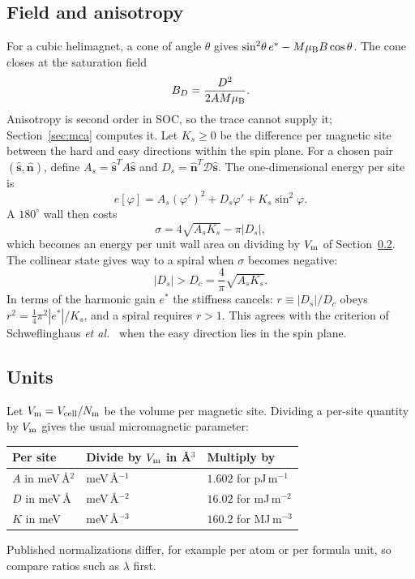\documentclass[11pt,a4paper]{article}
\numberwithin{equation}{section}
\newcommand{\vct}[1]{\bm{#1}}
\newcommand{\nh}{\hat{\vct n}}
\newcommand{\sh}{\hat{\vct s}}
\newcommand{\Nm}{N_{\mathrm m}}
\newcommand{\Dt}{\mathcal D}
\begin{document}
\subsection{Field and anisotropy}

For a cubic helimagnet, a cone of angle $\theta$ gives
$\sin^2\!\theta\,e^*-M\mu_{\rm B}B\cos\theta$. The cone closes at the saturation field
\begin{equation}\label{eq:bd}
 B_D=\frac{D^2}{2AM\mu_{\rm B}}.
\end{equation}
Anisotropy is second order in SOC, so the trace cannot supply it;
Section~\ref{sec:mca} computes it. Let $K_s\ge0$ be the difference per magnetic
site between the hard and easy directions within the spin plane. For a chosen
pair $(\sh,\nh)$, define $A_s=\sh^TA\sh$ and
$D_s=\nh^T\Dt\sh$. The one-dimensional energy per site is
\begin{equation}\label{eq:sg}
 e[\varphi]=A_s(\varphi')^2+D_s\varphi'+K_s\sin^2\varphi.
\end{equation}
A $180^\circ$ wall then costs
\begin{equation}\label{eq:wall}
 \sigma=4\sqrt{A_sK_s}-\pi|D_s|,
\end{equation}
which becomes an energy per unit wall area on dividing by $V_{\rm m}$ of
Section~\ref{sec:units}. The collinear state gives way to a spiral when $\sigma$ becomes negative:
\begin{equation}\label{eq:dc}
 |D_s|>D_c=\frac{4}{\pi}\sqrt{A_sK_s}.
\end{equation}
In terms of the harmonic gain $e^*$ the stiffness cancels:
$r\equiv|D_s|/D_c$ obeys $r^2=\tfrac14\pi^2|e^*|/K_s$, and a spiral requires
$r>1$. This agrees with the criterion of Schweflinghaus
\emph{et al.}~\cite{schwef} when the easy direction lies in the spin plane.

\subsection{Units}\label{sec:units}

Let $V_{\rm m}=V_{\rm cell}/\Nm$ be the volume per magnetic site. Dividing a
per-site quantity by $V_{\rm m}$ gives the usual micromagnetic parameter:
\begin{center}
\begin{tabular}{@{}lll@{}}
\toprule Per site & Divide by $V_{\rm m}$ in \AA$^3$ & Multiply by\\\midrule
$A$ in meV\,\AA$^2$ & meV\,\AA$^{-1}$ & $1.602$ for pJ\,m$^{-1}$\\
$D$ in meV\,\AA & meV\,\AA$^{-2}$ & $16.02$ for mJ\,m$^{-2}$\\
$K$ in meV & meV\,\AA$^{-3}$ & $160.2$ for MJ\,m$^{-3}$\\
\bottomrule
\end{tabular}
\end{center}
Published normalizations differ, for example per atom or per formula unit, so
compare ratios such as $\lambda$ first.
\end{document}
